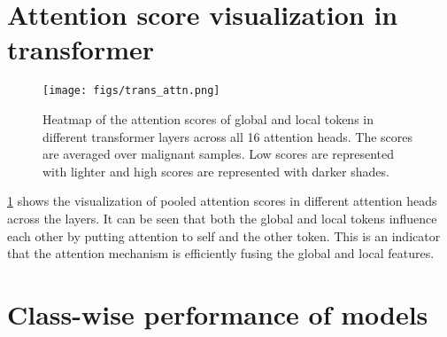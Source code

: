 \documentclass[twocolumn,final]{elsarticle}
\begin{document}
\section{Attention score visualization in transformer}
%
\begin{figure}
    \centering
    \texttt{[image: figs/trans\_attn.png]}
    \caption{Heatmap of the attention scores of global and local tokens in different transformer layers across all 16 attention heads. The scores are averaged over malignant samples. Low scores are represented with lighter and high scores are represented with darker shades.}
    \label{fig:attn_score}
\end{figure}

\cref{fig:attn_score} shows the visualization of pooled attention scores in different attention heads across the layers. It can be seen that both the global and local tokens influence each other by putting attention to self and the other token. This is an indicator that the attention mechanism is efficiently fusing the global and local features.

\section{Class-wise performance of models}
%
\begin{table}[h]
   \centering
    \caption{Class-wise performance of different models. We report the per-class accuracy for normal, benign, and malignant gallbladders.}
    \label{tab:classwise}
\end{table}
\end{document}
